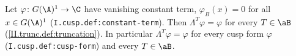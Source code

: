 Let $\varphi\colon G(\A)^1\to\C$ have vanishing constant term, $\varphi_B(x)=0$ for all $x\in G(\A)^1$ (\texttt{I.cusp.def:constant-term}). Then
$\Lambda^T\varphi=\varphi$ for every $T\in\aB$ (\cref{II.trunc.def:truncation}). In particular $\Lambda^T\varphi=\varphi$ for every cusp form
$\varphi$ (\texttt{I.cusp.def:cusp-form}) and every $T\in\aB$.
